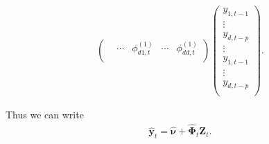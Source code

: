 \documentclass[fleqn]{article}
\begin{document}
\begin{align*}
\begin{pmatrix}
        & \cdots &
        \phi^{(1)}_{d1, t} & \cdots & \phi^{(1)}_{dd, t} \\
    \end{pmatrix}
    \begin{pmatrix}
        y_{1, t-1} \\
        \vdots \\
        y_{d, t-p} \\
        \vdots \\
        y_{1, t-1} \\
        \vdots \\
        y_{d, t-p} \\
    \end{pmatrix}.
\end{align*}

Thus we can write
\begin{align*}
    \hat{\bm y}_t = \hat{\bm \nu} + \hat{\bm \Phi}_t \bm Z_t.
\end{align*}
\end{document}
